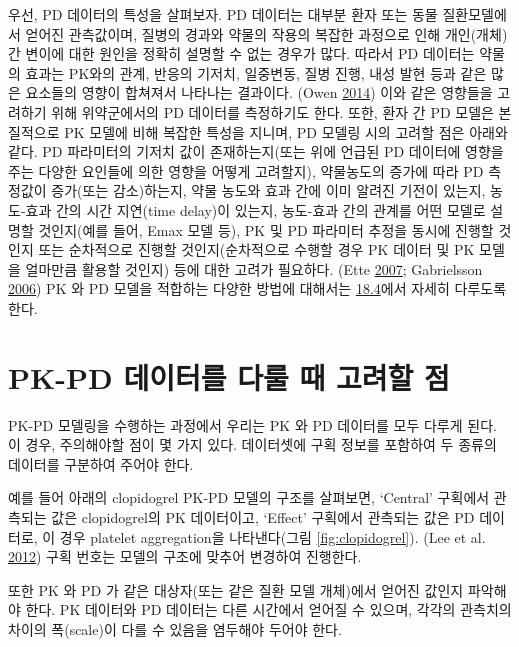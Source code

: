 \documentclass[
  10pt,
  krantz2,
  a4paper]{krantz}
\theoremstyle{definition}
\theoremstyle{definition}
\theoremstyle{definition}
\theoremstyle{remark}
\begin{document}
우선, PD 데이터의 특성을 살펴보자. PD 데이터는 대부분 환자 또는 동물 질환모델에서 얻어진 관측값이며, 질병의 경과와 약물의 작용의 복잡한 과정으로 인해 개인(개체) 간 변이에 대한 원인을 정확히 설명할 수 없는 경우가 많다. 따라서 PD 데이터는 약물의 효과는 PK와의 관계, 반응의 기저치, 일중변동, 질병 진행, 내성 발현 등과 같은 많은 요소들의 영향이 합쳐져서 나타나는 결과이다. (Owen \protect\hyperlink{ref-kelly}{2014}) 이와 같은 영향들을 고려하기 위해 위약군에서의 PD 데이터를 측정하기도 한다. 또한, 환자 간 PD 모델은 본질적으로 PK 모델에 비해 복잡한 특성을 지니며, PD 모델링 시의 고려할 점은 아래와 같다. PD 파라미터의 기저치 값이 존재하는지(또는 위에 언급된 PD 데이터에 영향을 주는 다양한 요인들에 의한 영향을 어떻게 고려할지), 약물농도의 증가에 따라 PD 측정값이 증가(또는 감소)하는지, 약물 농도와 효과 간에 이미 알려진 기전이 있는지, 농도-효과 간의 시간 지연(time delay)이 있는지, 농도-효과 간의 관계를 어떤 모델로 설명할 것인지(예를 들어, Emax 모델 등), PK 및 PD 파라미터 추정을 동시에 진행할 것인지 또는 순차적으로 진행할 것인지(순차적으로 수행할 경우 PK 데이터 및 PK 모델을 얼마만큼 활용할 것인지) 등에 대한 고려가 필요하다. (Ette \protect\hyperlink{ref-ette}{2007}; Gabrielsson \protect\hyperlink{ref-gabrielsson}{2006}) PK 와 PD 모델을 적합하는 다양한 방법에 대해서는 \protect\hyperlink{pkpd-link-method}{18.4}에서 자세히 다루도록 한다.

\hypertarget{pk-pd-uxb370uxc774uxd130uxb97c-uxb2e4uxb8f0-uxb54c-uxace0uxb824uxd560-uxc810}{%
\section{PK-PD 데이터를 다룰 때 고려할 점}\label{pk-pd-uxb370uxc774uxd130uxb97c-uxb2e4uxb8f0-uxb54c-uxace0uxb824uxd560-uxc810}}

PK-PD 모델링을 수행하는 과정에서 우리는 PK 와 PD 데이터를 모두 다루게 된다. 이 경우, 주의해야할 점이 몇 가지 있다. 데이터셋에 구획 정보를 포함하여 두 종류의 데이터를 구분하여 주어야 한다.

예를 들어 아래의 clopidogrel PK-PD 모델의 구조를 살펴보면, `Central' 구획에서 관측되는 값은 clopidogrel의 PK 데이터이고, `Effect' 구획에서 관측되는 값은 PD 데이터로, 이 경우 platelet aggregation을 나타낸다(그림 \ref{fig:clopidogrel}). (Lee et al. \protect\hyperlink{ref-lee2012population}{2012}) 구획 번호는 모델의 구조에 맞추어 변경하여 진행한다.

또한 PK 와 PD 가 같은 대상자(또는 같은 질환 모델 개체)에서 얻어진 값인지 파악해야 한다. PK 데이터와 PD 데이터는 다른 시간에서 얻어질 수 있으며, 각각의 관측치의 차이의 폭(scale)이 다를 수 있음을 염두해야 두어야 한다.
\end{document}
